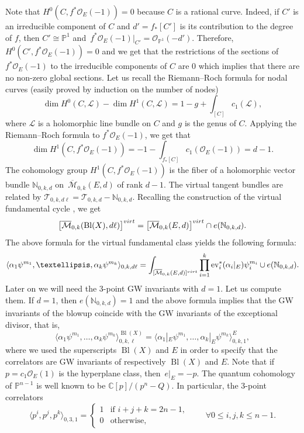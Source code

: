 \documentclass[10pt,a4paper]{article}
\numberwithin{equation}{section}
\newcommand{\CC}{\mathbb{C}}
\newcommand{\PP}{\mathbb{P}}
\newcommand{\T}{\mathcal{T}}
\renewcommand{\O}{\mathcal{O}}
\newcommand{\M}{\mathcal{M}}
\begin{document}
Note that $H^0(C,f^*\mathcal{O}_E(-1))=0$ because $C$ is a rational curve. Indeed, if $C'$ is an irreducible component of $C$ and $d'=f_*[C']$ is its contribution to the degree of $f$, then $C'\cong \PP^1$ and~$f^*\mathcal{O}_E(-1)|_{C'}= \O_{\PP^1}(-d') $. Therefore, $H^0(C', f^*\mathcal{O}_E(-1))=0$ and we get that the restrictions of the sections of $f^*\O_{E}(-1)$ to the irreducible components of $C$ are $0$ which implies that there are no non-zero global sections. Let us recall the Riemann--Roch formula for nodal curves (easily proved by induction on the number of nodes)
\[
\operatorname{dim} H^0(C,\mathcal{L}) -
\operatorname{dim} H^1(C,\mathcal{L}) = 1-g + \int_{[C]} c_1(\mathcal{L}),
\]
where $\mathcal{L}$ is a holomorphic line bundle on $C$ and $g$ is the genus of $C$. Applying the Riemann--Roch formula to $f^*\O_E(-1)$, we get that
\[
\operatorname{dim} H^1(C, f^*\O_E(-1)) =
-1-\int_{f_*[C]} c_1(\O_E(-1)) = d-1.
\]
The cohomology group $H^1(C, f^*\O_E(-1))$ is the fiber of a holomorphic vector bundle $\mathbb{N}_{0,k,d}$ on~$\overline{\M}_{0,k}(E,d)$ of rank $d-1$. The virtual tangent bundles are related by $\T_{0,k,d\ell} = \T_{0,k,d} -\mathbb{N}_{0,k,d}$. Recalling the construction of the virtual fundamental cycle \cite{BF_intnormalcone}, we get
\[
\big[\overline{\mathcal{M}}_{0,k}(\operatorname{Bl}(X), d\ell)\big]^{\rm virt} =
\big[\overline{\mathcal{M}}_{0,k}(E, d)\big]^{\rm virt} \cap e(\mathbb{N}_{0,k,d}).
\]
The above formula for the virtual fundamental class yields the
following formula:
\[
\langle \alpha_1 \psi^{m_1},\dots, \alpha_k \psi^{m_k}\rangle_{0,k,d\ell} =
\int_{
[\overline{\mathcal{M}}_{0,k}(E, d)]^{\rm virt} }
\prod_{i=1}^k \operatorname{ev}_i^*(\alpha_i|_E) \psi_i^{m_i} \cup e(\mathbb{N}_{0,k,d}).
\]
Later on we will need the 3-point GW invariants with $d=1$. Let us compute them.
If $d=1$, then $e(\mathbb{N}_{0,k,d})=1$ and the above formula implies that the GW invariants of the blowup coincide with the GW invariants of the exceptional divisor, that is,
\[
\langle \alpha_1 \psi^{m_1},\dots, \alpha_k \psi^{m_k}
\rangle_{0,k,\ell}^{\operatorname{Bl}(X)} =
\langle \alpha_1|_E \psi^{m_1},\dots, \alpha_k|_E \psi^{m_k}
\rangle_{0,k,1}^E,
\]
where we used the superscripts $\operatorname{Bl}(X)$ and $E$ in order to specify that the correlators are GW invariants of respectively $\operatorname{Bl}(X)$ and $E$. Note that if $p=c_1\O_E(1)$ is the hyperplane class, then~$e|_{E} =-p$. The quantum cohomology of $\PP^{n-1}$ is well known to be $\CC[p]/(p^n-Q)$. In particular, the 3-point correlators
\[
\big\langle p^i,p^j,p^k\big\rangle_{0,3,1} =
\begin{cases}
1 & \mbox{if } i+j+k=2n-1,\\
0 & \mbox{otherwise},
\end{cases}
\qquad \forall
0\leq i,j,k\leq n-1.
\]
\end{document}
